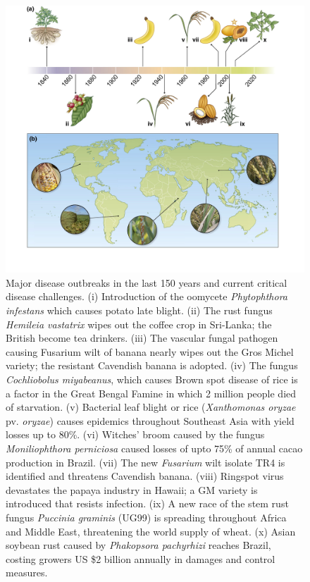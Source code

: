 \documentclass[11pt,dvipsnames,ignorenonframetext,aspectratio=169]{beamer}
\begin{document}
\begin{frame}{}
\protect\hypertarget{section-3}{}
\begin{figure}
\includegraphics[width=0.4\linewidth]{../images/crop_pandemic_history} \caption{Major disease outbreaks in the last 150 years and current critical disease challenges. (i) Introduction of the oomycete \textit{Phytophthora infestans} which causes potato late blight. (ii) The rust fungus \textit{Hemileia vastatrix} wipes out the coffee crop in Sri-Lanka; the British become tea drinkers. (iii) The vascular fungal pathogen causing Fusarium wilt of banana nearly wipes out the Gros Michel variety; the resistant Cavendish banana is adopted. (iv) The fungus \textit{Cochliobolus miyabeanus}, which causes Brown spot disease of rice is a factor in the Great Bengal Famine in which 2 million people died of starvation. (v) Bacterial leaf blight or rice (\textit{Xanthomonas oryzae} pv. \textit{oryzae}) causes epidemics throughout Southeast Asia with yield losses up to 80\%. (vi) Witches' broom caused by the fungus \textit{Moniliophthora perniciosa} caused losses of upto 75\% of annual cacao production in Brazil. (vii) The new \textit{Fusarium} wilt isolate TR4 is identified and threatens Cavendish banana. (viii) Ringspot virus devastates the papaya industry in Hawaii; a GM variety is introduced that resists infection. (ix) A new race of the stem rust fungus \textit{Puccinia graminis} (UG99) is spreading throughout Africa and Middle East, threatening the world supply of wheat. (x) Asian soybean rust caused by \textit{Phakopsora pachyrhizi} reaches Brazil, costing growers US \$2 billion annually in damages and control measures.}\label{fig:crop-pandemic-history}
\end{figure}
\end{frame}
\end{document}
